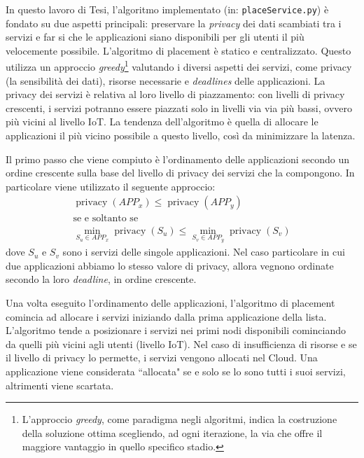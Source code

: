 In questo lavoro di Tesi, l'algoritmo implementato (in: \texttt{placeService.py}) è fondato su due aspetti principali: preservare la \textit{privacy} dei dati scambiati tra i servizi e far si che le applicazioni siano disponibili per gli utenti il più velocemente possibile. L'algoritmo di placement è statico e centralizzato. Questo utilizza un approccio \textit{greedy}\footnote{L'approccio \textit{greedy}, come paradigma negli algoritmi, indica la costruzione della soluzione ottima scegliendo, ad ogni iterazione, la via che offre il maggiore vantaggio in quello specifico stadio. } valutando i diversi aspetti dei servizi, come privacy (la sensibilità dei dati), risorse necessarie e \textit{deadlines} delle applicazioni. La privacy dei servizi è relativa al loro livello di piazzamento: con livelli di privacy crescenti, i servizi potranno essere piazzati solo in livelli via via più bassi, ovvero più vicini al livello IoT. La tendenza dell'algoritmo è quella di allocare le applicazioni il più vicino possibile a questo livello, così da minimizzare la latenza.

Il primo passo che viene compiuto è l'ordinamento delle applicazioni secondo un ordine crescente sulla base del livello di privacy dei servizi che la compongono. In particolare viene utilizzato il seguente approccio:
\begin{equation*}  
	\begin{array}{c}

\displaystyle \operatorname{privacy}(APP_x) \leq \operatorname{privacy}(APP_y)\\
\text{se e soltanto se}\\
\displaystyle \min_{S_u \in APP_x} \operatorname{privacy}(S_u) \leq \min_{S_v \in APP_y} \operatorname{privacy}(S_v)
 	\end{array}
\end{equation*}
dove $S_u$ e $S_v$ sono i servizi delle singole applicazioni. Nel caso particolare in cui due applicazioni abbiamo lo stesso valore di privacy, allora vegnono ordinate secondo la loro \textit{deadline}, in ordine crescente.

Una volta eseguito l'ordinamento delle applicazioni, l'algoritmo di placement comincia ad allocare i servizi iniziando dalla prima applicazione della lista. L'algoritmo tende a posizionare i servizi nei primi nodi disponibili cominciando da quelli più vicini agli utenti (livello IoT). Nel caso di insufficienza di risorse e se il livello di privacy lo permette, i servizi vengono allocati nel Cloud. Una applicazione viene considerata ``allocata" se e solo se lo sono tutti i suoi servizi, altrimenti viene scartata.

